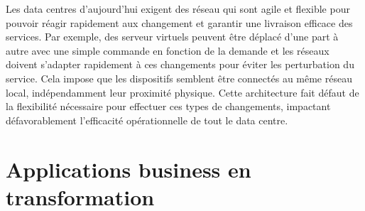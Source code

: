Les data centres d'aujourd'hui exigent des réseau qui sont agile et flexible pour pouvoir réagir rapidement aux changement et garantir une livraison efficace des services. Par exemple, des serveur virtuels peuvent être déplacé d'une part à autre avec une simple commande en fonction de la demande et les réseaux doivent s'adapter rapidement à ces changements pour éviter les perturbation du service. Cela impose que les dispositifs semblent être connectés au même réseau local, indépendamment leur proximité physique. Cette architecture fait défaut de la flexibilité nécessaire pour effectuer ces types de changements, impactant défavorablement l'efficacité opérationnelle de tout le data centre.

\section{Applications business en transformation}





